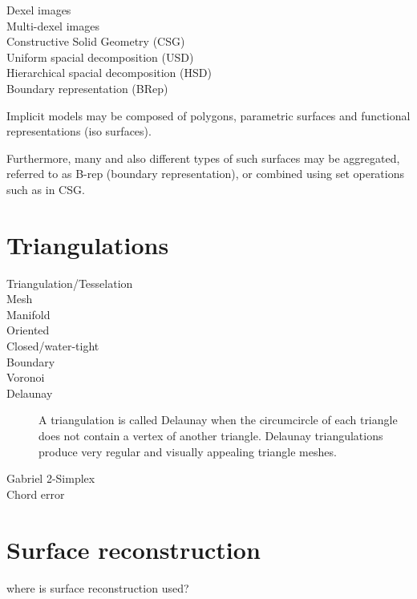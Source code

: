 \begin{description}
	\item[Dexel images]
	
	\item[Multi-dexel images]
	
	\item[Constructive Solid Geometry (CSG)]
	
	\item[Uniform spacial decomposition (USD)]
	
	\item[Hierarchical spacial decomposition (HSD)]
	
	\item[Boundary representation (BRep)]
	
\end{description}

Implicit models may be composed of polygons, parametric surfaces and functional representations (iso surfaces).

Furthermore, many and also different types of such surfaces may be aggregated, referred to as B-rep (boundary representation), or combined using set operations such as in CSG.



\section{Triangulations}
\label{sec:definitions}

\begin{description}
	\item[Triangulation/Tesselation]
	
	\item[Mesh]
	
	\item[Manifold]
	
	\item[Oriented]
	
	\item[Closed/water-tight]
	
	\item[Boundary]
	
	\item[Voronoi]
	
	\item[Delaunay]
	A triangulation is called Delaunay when the circumcircle of each triangle does not contain a vertex of another triangle.
	Delaunay triangulations produce very regular and visually appealing triangle meshes.
	
	\item[Gabriel 2-Simplex]
	
	\item[Chord error]
	
\end{description}


\section{Surface reconstruction}
\label{sec:surface_reconstruction}

where is surface reconstruction used?
